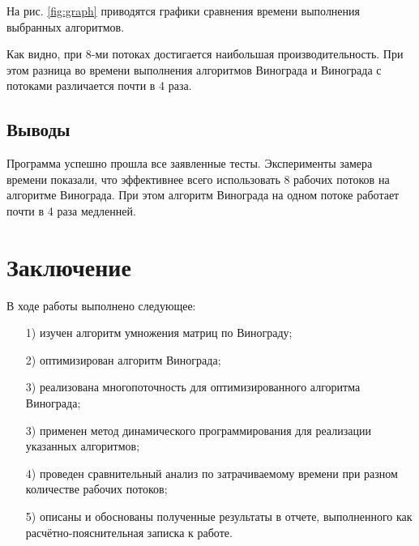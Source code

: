 \documentclass[a4paper,12pt]{article}
\begin{document}
На рис. \ref{fig:graph} приводятся графики сравнения времени выполнения выбранных алгоритмов.


Как видно, при 8-ми потоках достигается наибольшая производительность. При этом разница во времени выполнения алгоритмов Винограда и Винограда с потоками различается почти в 4 раза.

\subsection*{Выводы}

Программа успешно прошла все заявленные тесты. Эксперименты замера времени  показали, что эффективнее всего использовать 8 рабочих потоков на алгоритме Винограда. При этом алгоритм Винограда на одном потоке работает почти в 4 раза медленней.


\section*{Заключение}

В ходе работы выполнено следующее:

\begin{enumerate} 
	\item[1)] изучен алгоритм умножения матриц по Винограду;
	\item[2)] оптимизирован алгоритм Винограда;
	\item[3)] реализована многопоточность для оптимизированного алгоритма Винограда;
	\item[3)] применен метод динамического программирования для реализации указанных алгоритмов;
	\item[4)] проведен сравнительный анализ по затрачиваемому времени при разном количестве рабочих потоков;
	\item[5)] описаны и обоснованы полученные результаты в отчете, выполненного как расчётно-пояснительная записка к работе. 
\end{enumerate}
\end{document}

